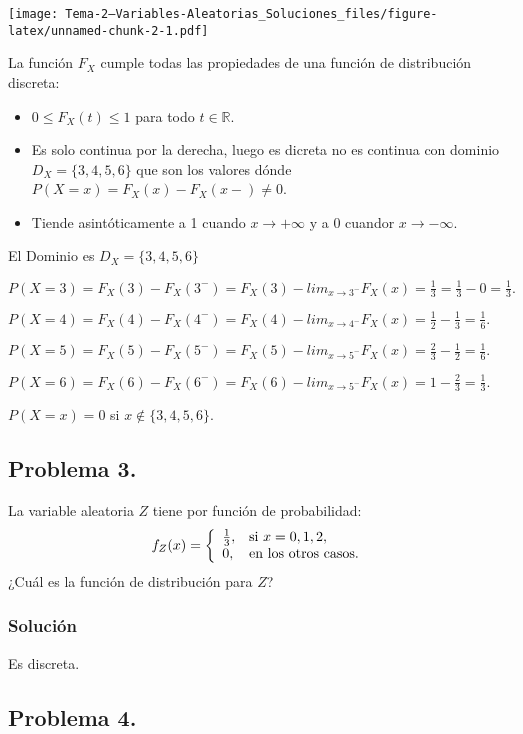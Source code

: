 \documentclass[
]{article}
\providecommand{\tightlist}{%
  \setlength{\itemsep}{0pt}\setlength{\parskip}{0pt}}
\begin{document}
\texttt{[image: Tema-2---Variables-Aleatorias\_Soluciones\_files/figure-latex/unnamed-chunk-2-1.pdf]}

La función \(F_X\) cumple todas las propiedades de una función de
distribución discreta:

\begin{itemize}
\tightlist
\item
  \(0\leq F_X(t)\leq 1\) para todo \(t\in \mathbb{R}.\)
\item
  Es solo continua por la derecha, luego es dicreta no es continua con
  dominio \(D_X=\{3,4,5,6\}\) que son los valores dónde
  \(P(X=x)=F_X(x)-F_X(x-)\not=0\).
\item
  Tiende asintóticamente a 1 cuando \(x\to+\infty\) y a 0 cuandor
  \(x\to-\infty\).
\end{itemize}

El Dominio es \(D_X=\{3,4,5,6\}\)

\(P(X=3)=F_X(3)-F_X(3^{-})=F_X(3)-lim_{x\to 3^{-}} F_X(x)=\frac{1}{3}=\frac{1}{3}-0=\frac{1}{3}.\)

\(P(X=4)=F_X(4)-F_X(4^{-})=F_X(4)-lim_{x\to 4^{-}} F_X(x)=\frac{1}{2}-\frac{1}{3}=\frac{1}{6}.\)

\(P(X=5)=F_X(5)-F_X(5^{-})=F_X(5)-lim_{x\to 5^{-}} F_X(x)=\frac{2}{3}-\frac{1}{2}=\frac{1}{6}.\)

\(P(X=6)=F_X(6)-F_X(6^{-})=F_X(6)-lim_{x\to 5^{-}} F_X(x)=1-\frac{2}{3}=\frac{1}{3}.\)

\(P(X=x)=0\) si \(x \not\in\{3,4,5,6\}.\)

\hypertarget{problema-3.}{%
\subsection{Problema 3.}\label{problema-3.}}

La variable aleatoria \(Z\) tiene por función de probabilidad:
\[f_Z (x)=
\left\{\begin{array}{ll}
{1\over 3}, & \mbox{si $x=0,1,2$},\\ 0, & \mbox{en los otros
casos.}
\end{array}\right.
\] ¿Cuál es la función de distribución para \(Z\)?

\hypertarget{soluciuxf3n-2}{%
\subsubsection{Solución}\label{soluciuxf3n-2}}

Es discreta.

\hypertarget{problema-4.}{%
\subsection{Problema 4.}\label{problema-4.}}
\end{document}
